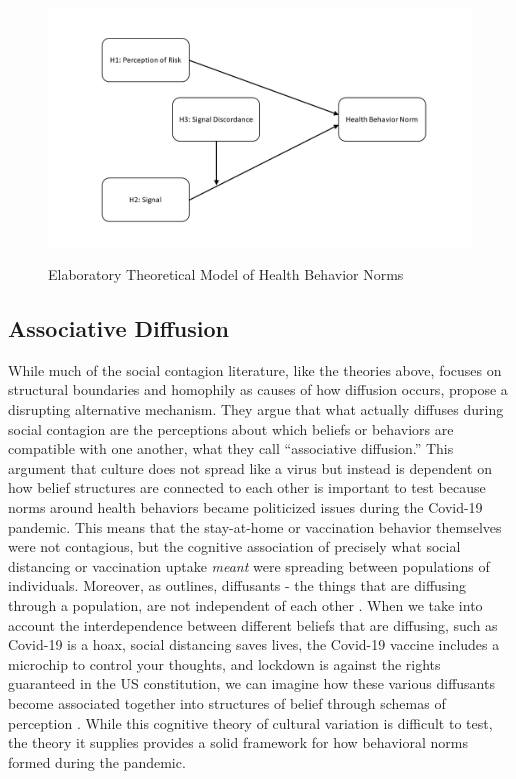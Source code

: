 \begin{figure}
{\centering \includegraphics[width=0.8\linewidth]{figs/paper3/dag}}
\caption{Elaboratory Theoretical Model of Health Behavior Norms}\label{fig:dag}
\end{figure}

\hypertarget{associative-diffusion}{%
\subsection{Associative Diffusion}\label{associative-diffusion}}

While much of the social contagion literature, like the theories above, focuses
on structural boundaries and homophily as causes of how diffusion occurs,
\citet{goldbergSocialContagionAssociative2018} propose a
disrupting alternative mechanism. They argue that what actually diffuses during
social contagion are the perceptions about which beliefs or behaviors are
compatible with one another, what they call ``associative diffusion.'' This
argument that culture does not spread like a virus but instead is dependent on
how belief structures are connected to each other is important to test because
norms around health behaviors became politicized issues during the Covid-19
pandemic. This means that the stay-at-home or vaccination behavior themselves
were not contagious, but the cognitive association of precisely what social
distancing or vaccination uptake \emph{meant} were spreading between populations of
individuals. Moreover, as \citet{houghtonSocialContagionInteracting2021} outlines, diffusants - the things that are
diffusing through a population, are not independent of each other \citep{mason_etal07}. When we take into account the interdependence between different beliefs that are diffusing, such as Covid-19 is a hoax, social distancing saves
lives, the Covid-19 vaccine includes a microchip to control your thoughts, and lockdown
is against the rights guaranteed in the US constitution, we can imagine how
these various diffusants become associated together into structures of belief
through schemas of perception \citep{houghtonSocialContagionInteracting2021}. While this cognitive theory of cultural variation is difficult to test, the theory it supplies provides a solid framework for how behavioral norms formed during the pandemic.

